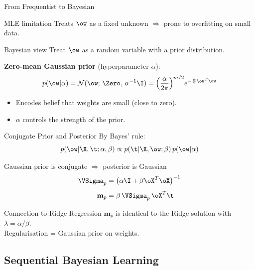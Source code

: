 \begin{frame}{From Frequentist to Bayesian}
  \begin{alertblock}{MLE limitation}
    Treats $\ow$ as a fixed unknown $\Rightarrow$ prone to overfitting on small data.
  \end{alertblock}
  \vspace{.3em}
  \begin{block}{Bayesian view}
    Treat $\ow$ as a \alert{random variable} with a prior distribution.
  \end{block}
  \vspace{.3em}
  \textbf{Zero-mean Gaussian prior} (hyperparameter $\alpha$):
  \[
    p(\ow|\alpha) = \mathcal{N}(\ow;\,\Zero,\,\alpha^{-1}\I) = \left(\frac{\alpha}{2\pi}\right)^{m/2}\!
    e^{-\frac{\alpha}{2}\ow^T\ow}
  \]
  \begin{itemize}
    \item Encodes belief that weights are small (close to zero).
    \item $\alpha$ controls the \alert{strength of the prior}.
  \end{itemize}
\end{frame}

\begin{frame}{Conjugate Prior and Posterior}
  By Bayes' rule:
  \[
    p(\ow|\X,\t;\alpha,\beta) \propto p(\t|\X,\ow;\beta)\,p(\ow|\alpha)
  \]
  \begin{block}{Gaussian prior is conjugate $\Rightarrow$ posterior is Gaussian}
    \begin{align*}
      \VSigma_p &= \bigl(\alpha\I + \beta\oX^T\oX\bigr)^{-1}\\[4pt]
      \mathbf{m}_p &= \beta\,\VSigma_p\,\oX^T\t
    \end{align*}
  \end{block}
  \begin{exampleblock}{Connection to Ridge Regression}
    $\mathbf{m}_p$ is identical to the Ridge solution with $\lambda = \alpha/\beta$.\\
    \alert{Regularisation = Gaussian prior on weights.}
  \end{exampleblock}
\end{frame}

\subsection{Sequential Bayesian Learning}

